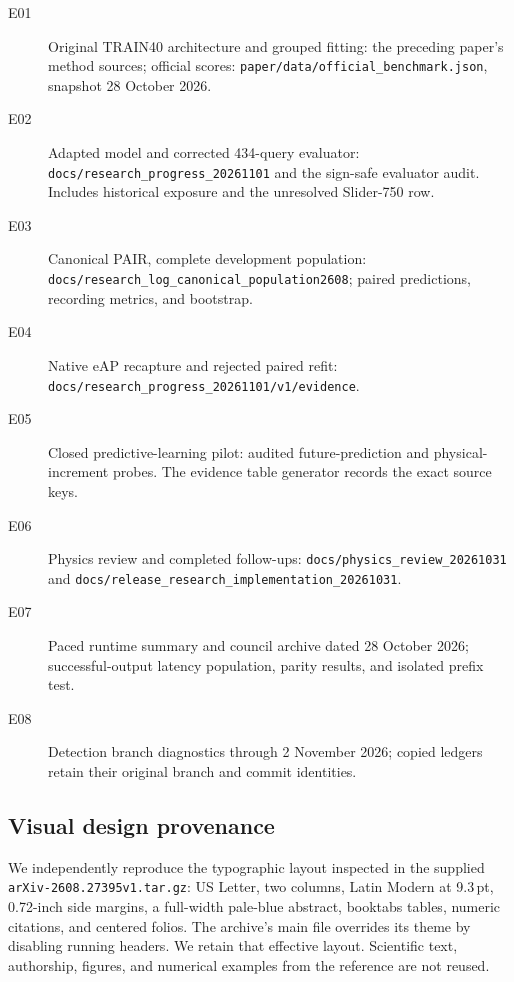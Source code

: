 \documentclass[twocolumn,letterpaper]{article}
\begin{document}
\begin{description}
\item[E01] Original TRAIN40 architecture and grouped fitting: the preceding paper's method sources; official scores: \texttt{paper/data/official\_benchmark.json}, snapshot 28 October 2026.
\item[E02] Adapted model and corrected 434-query evaluator: \texttt{docs/research\_progress\_20261101} and the sign-safe evaluator audit. Includes historical exposure and the unresolved Slider-750 row.
\item[E03] Canonical PAIR, complete development population: \texttt{docs/research\_log\_canonical\_population2608}; paired predictions, recording metrics, and bootstrap.
\item[E04] Native eAP recapture and rejected paired refit: \texttt{docs/research\_progress\_20261101/v1/evidence}.
\item[E05] Closed predictive-learning pilot: audited future-prediction and physical-increment probes. The evidence table generator records the exact source keys.
\item[E06] Physics review and completed follow-ups: \texttt{docs/physics\_review\_20261031} and \texttt{docs/release\_research\_implementation\_20261031}.
\item[E07] Paced runtime summary and council archive dated 28 October 2026; successful-output latency population, parity results, and isolated prefix test.
\item[E08] Detection branch diagnostics through 2 November 2026; copied ledgers retain their original branch and commit identities.
\end{description}

\subsection{Visual design provenance}
We independently reproduce the typographic layout inspected in the supplied \texttt{arXiv-2608.27395v1.tar.gz}: US Letter, two columns, Latin Modern at 9.3\,pt, 0.72-inch side margins, a full-width pale-blue abstract, booktabs tables, numeric citations, and centered folios. The archive's main file overrides its theme by disabling running headers. We retain that effective layout. Scientific text, authorship, figures, and numerical examples from the reference are not reused.

\newpage


\end{document}
